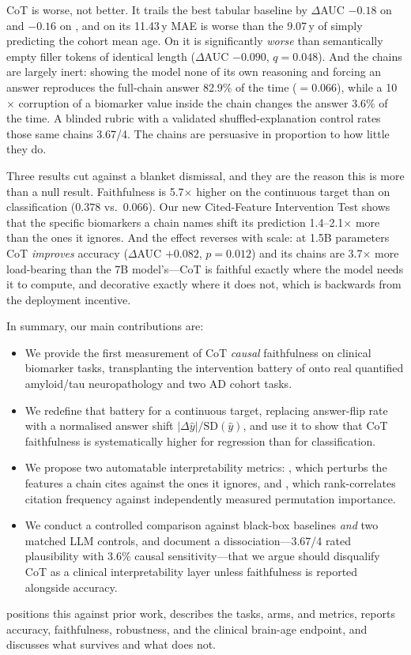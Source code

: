  CoT is worse, not better. It trails the best tabular baseline by
$\Delta$AUC $-0.18$ on \taskone and $-0.16$ on \taskthree, and on \tasktwo its 11.43\,y MAE is worse
than the 9.07\,y of simply predicting the cohort mean age. On \taskone it is significantly
\emph{worse} than semantically empty filler tokens of identical length ($\Delta$AUC $-0.090$,
$q=0.048$). And the chains are largely inert: showing the model none of its own reasoning and
forcing an answer reproduces the full-chain answer 82.9\% of the time (\aoc $=0.066$), while a
10$\times$ corruption of a biomarker value inside the chain changes the answer 3.6\% of the time.
A blinded rubric with a validated shuffled-explanation control rates those same chains 3.67/4. The
chains are persuasive in proportion to how little they do.

Three results cut against a blanket dismissal, and they are the reason this is more than a null
result. Faithfulness is 5.7$\times$ higher on the continuous target than on classification
(\aoc $0.378$ vs.\ $0.066$). Our new Cited-Feature Intervention Test shows that the specific
biomarkers a chain names shift its prediction 1.4--2.1$\times$ more than the ones it ignores. And
the effect reverses with scale: at 1.5B parameters CoT \emph{improves} accuracy
($\Delta$AUC $+0.082$, $p=0.012$) and its chains are 3.7$\times$ more load-bearing than the 7B
model's---CoT is faithful exactly where the model needs it to compute, and decorative exactly where
it does not, which is backwards from the deployment incentive.

In summary, our main contributions are:
\begin{itemize}[leftmargin=*,itemsep=0pt,topsep=0pt]
    \item We provide the first measurement of CoT \emph{causal} faithfulness on clinical biomarker
    tasks, transplanting the intervention battery of \citet{lanham2023faithfulness} onto real
    quantified amyloid/tau neuropathology and two AD cohort tasks.
    \item We redefine that battery for a continuous target, replacing answer-flip rate with a
    normalised answer shift $|\Delta\hat{y}|/\mathrm{SD}(\hat{y})$, and use it to show that CoT
    faithfulness is systematically higher for regression than for classification.
    \item We propose two automatable interpretability metrics: \cfit, which perturbs the features a
    chain cites against the ones it ignores, and \esa, which rank-correlates citation frequency
    against independently measured permutation importance.
    \item We conduct a controlled comparison against black-box baselines \emph{and} two matched
    LLM controls, and document a dissociation---3.67/4 rated plausibility with 3.6\% causal
    sensitivity---that we argue should disqualify CoT as a clinical interpretability layer unless
    faithfulness is reported alongside accuracy.
\end{itemize}

 positions this against prior work,  describes the tasks,
arms, and metrics,  reports accuracy, faithfulness, robustness, and the clinical
brain-age endpoint, and  discusses what survives and what does not.
